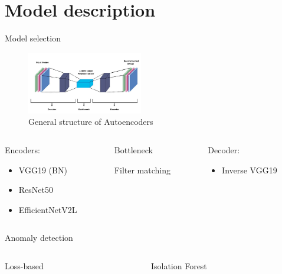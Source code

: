\documentclass[aspectratio=169]{beamer}
\begin{document}
\section{Model description}
\begin{frame}{Model selection}
    \begin{figure}[t]
        \centering
        \includegraphics[width=0.45\textwidth,trim={0 0 0 1cm},clip]{./tex_images/autoencoder.jpeg}
        \caption*{General structure of Autoencoders}
    \end{figure}
    \begin{columns}[T]
        \begin{column}{0.25\textwidth}
            Encoders:
            \begin{itemize}
                \item VGG19 (BN)
                \item ResNet50
                \item EfficientNetV2L
            \end{itemize}
        \end{column}
        \begin{column}{0.25\textwidth}
            \centering
            Bottleneck

            Filter matching
        \end{column}
        \begin{column}{0.25\textwidth}
            Decoder:
            \begin{itemize}
                \item Inverse VGG19
            \end{itemize}
        \end{column}
    \end{columns}
\end{frame}

\begin{frame}[t]{Anomaly detection}
    \begin{columns}[T]
        \begin{column}{0.45\textwidth}
            Loss-based
        \end{column}
        \begin{column}{0.45\textwidth}
            Isolation Forest
        \end{column}
    \end{columns}
\end{frame}
\end{document}
